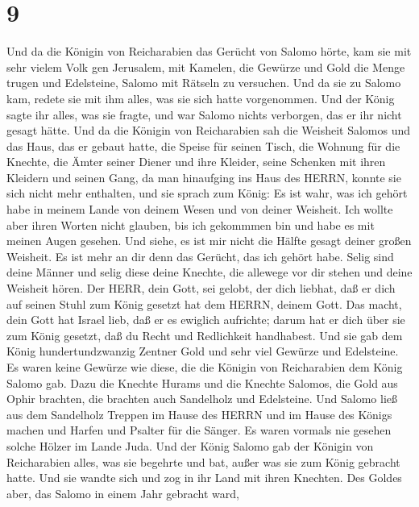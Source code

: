 \hypertarget{section-8}{%
\section{9}\label{section-8}}

 Und da die Königin von Reicharabien das Gerücht von Salomo
hörte, kam sie mit sehr vielem Volk gen Jerusalem, mit Kamelen, die
Gewürze und Gold die Menge trugen und Edelsteine, Salomo mit Rätseln zu
versuchen. Und da sie zu Salomo kam, redete sie mit ihm alles, was sie
sich hatte vorgenommen.  Und der König sagte ihr alles, was
sie fragte, und war Salomo nichts verborgen, das er ihr nicht gesagt
hätte.  Und da die Königin von Reicharabien sah die Weisheit
Salomos und das Haus, das er gebaut hatte,  die Speise für
seinen Tisch, die Wohnung für die Knechte, die Ämter seiner Diener und
ihre Kleider, seine Schenken mit ihren Kleidern und seinen Gang, da man
hinaufging ins Haus des HERRN, konnte sie sich nicht mehr enthalten,
 und sie sprach zum König: Es ist wahr, was ich gehört habe
in meinem Lande von deinem Wesen und von deiner Weisheit. 
Ich wollte aber ihren Worten nicht glauben, bis ich gekommmen bin und
habe es mit meinen Augen gesehen. Und siehe, es ist mir nicht die Hälfte
gesagt deiner großen Weisheit. Es ist mehr an dir denn das Gerücht, das
ich gehört habe.  Selig sind deine Männer und selig diese
deine Knechte, die allewege vor dir stehen und deine Weisheit hören.
 Der HERR, dein Gott, sei gelobt, der dich liebhat, daß er
dich auf seinen Stuhl zum König gesetzt hat dem HERRN, deinem Gott. Das
macht, dein Gott hat Israel lieb, daß er es ewiglich aufrichte; darum
hat er dich über sie zum König gesetzt, daß du Recht und Redlichkeit
handhabest.  Und sie gab dem König hundertundzwanzig Zentner
Gold und sehr viel Gewürze und Edelsteine. Es waren keine Gewürze wie
diese, die die Königin von Reicharabien dem König Salomo gab.
 Dazu die Knechte Hurams und die Knechte Salomos, die Gold
aus Ophir brachten, die brachten auch Sandelholz und Edelsteine.
 Und Salomo ließ aus dem Sandelholz Treppen im Hause des
HERRN und im Hause des Königs machen und Harfen und Psalter für die
Sänger. Es waren vormals nie gesehen solche Hölzer im Lande Juda.
 Und der König Salomo gab der Königin von Reicharabien
alles, was sie begehrte und bat, außer was sie zum König gebracht hatte.
Und sie wandte sich und zog in ihr Land mit ihren Knechten.
 Des Goldes aber, das Salomo in einem Jahr gebracht ward,
